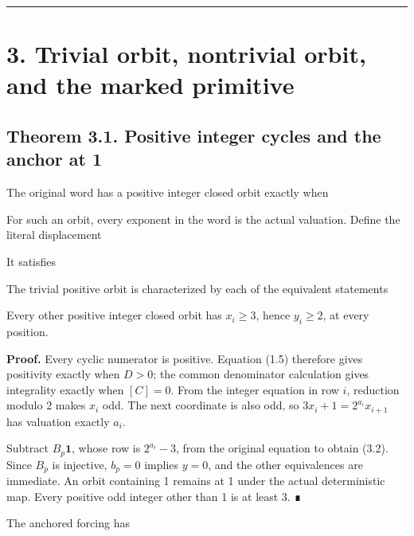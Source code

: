 \begin{center}\rule{0.5\linewidth}{0.5pt}\end{center}

\section{3. Trivial orbit, nontrivial orbit, and the marked primitive}

\subsection{Theorem 3.1. Positive integer cycles and the anchor at 1}

The original word has a positive integer closed orbit exactly when


For such an orbit, every exponent in the word is the actual valuation.
Define the literal displacement


It satisfies


The trivial positive orbit is characterized by each of the equivalent
statements


Every other positive integer closed orbit has \(x_i\ge3\), hence
\(y_i\ge2\), at every position.

\textbf{Proof.} Every cyclic numerator is positive. Equation (1.5)
therefore gives positivity exactly when \(D>0\); the common denominator
calculation gives integrality exactly when \([C]=0\). From the integer
equation in row \(i\), reduction modulo 2 makes \(x_i\) odd. The next
coordinate is also odd, so \(3x_i+1=2^{a_i}x_{i+1}\) has valuation
exactly \(a_i\).

Subtract \(B_p\mathbf1\), whose row is \(2^{a_i}-3\), from the original
equation to obtain (3.2). Since \(B_p\) is injective, \(b_p=0\) implies
\(y=0\), and the other equivalences are immediate. An orbit containing 1
remains at 1 under the actual deterministic map. Every positive odd
integer other than 1 is at least 3. ∎

The anchored forcing has


